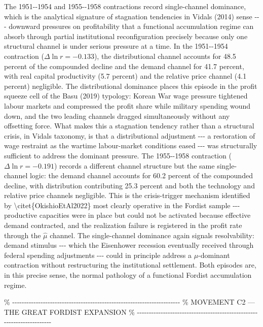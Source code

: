 The 1951-\/-1954 and 1955-\/-1958 contractions record single-channel
dominance, which is the analytical signature of stagnation tendencies in
Vidal\textquotesingle s (2014) sense -\/-\/- downward pressures on
profitability that a functional accumulation regime can absorb through
partial institutional reconfiguration precisely because only one
structural channel is under serious pressure at a time. In the
1951-\/-1954 contraction (\(\Delta\ln r
= -0.133\)), the distributional channel accounts for 48.5 percent of the
compounded decline and the demand channel for 41.7 percent, with real
capital productivity (5.7 percent) and the relative price channel (4.1
percent) negligible. The distributional dominance places this episode in
the profit squeeze cell of the Basu (2019) typology: Korean War wage
pressure tightened labour markets and compressed the profit share while
military spending wound down, and the two leading channels dragged
simultaneously without any offsetting force. What makes this a
stagnation tendency rather than a structural crisis, in
Vidal\textquotesingle s taxonomy, is that a distributional adjustment
-\/-\/- a restoration of wage restraint as the wartime labour-market
conditions eased -\/-\/- was structurally sufficient to address the
dominant pressure. The 1955-\/-1958 contraction (\(\Delta\ln r
= -0.191\)) records a different channel structure but the same
single-channel logic: the demand channel accounts for 60.2 percent of
the compounded decline, with distribution contributing 25.3 percent and
both the technology and relative price channels negligible. This is the
crisis-trigger mechanism identified by
\textbackslash citet\{OkishioEtAl2022\} most clearly operative in the
Fordist sample -\/-\/- productive capacities were in place but could not
be activated because effective demand contracted, and the realization
failure is registered in the profit rate through the \(\hat{\mu}\)
channel. The single-channel dominance again signals resolvability:
demand stimulus -\/-\/- which the Eisenhower recession eventually
received through federal spending adjustments -\/-\/- could in principle
address a \(\mu\)-dominant contraction without restructuring the
institutional settlement. Both episodes are, in this precise sense, the
normal pathology of a functional Fordist accumulation regime.

\%
-\/-\/-\/-\/-\/-\/-\/-\/-\/-\/-\/-\/-\/-\/-\/-\/-\/-\/-\/-\/-\/-\/-\/-\/-\/-\/-\/-\/-\/-\/-\/-\/-\/-\/-\/-\/-\/-\/-\/-\/-\/-\/-\/-\/-\/-\/-\/-\/-\/-\/-\/-\/-\/-\/-\/-\/-\/-\/-\/-\/-\/-\/-\/-\/-\/-\/-\/-\/-\/-\/-
\% MOVEMENT C2 --- THE GREAT FORDIST EXPANSION \%
-\/-\/-\/-\/-\/-\/-\/-\/-\/-\/-\/-\/-\/-\/-\/-\/-\/-\/-\/-\/-\/-\/-\/-\/-\/-\/-\/-\/-\/-\/-\/-\/-\/-\/-\/-\/-\/-\/-\/-\/-\/-\/-\/-\/-\/-\/-\/-\/-\/-\/-\/-\/-\/-\/-\/-\/-\/-\/-\/-\/-\/-\/-\/-\/-\/-\/-\/-\/-\/-\/-

